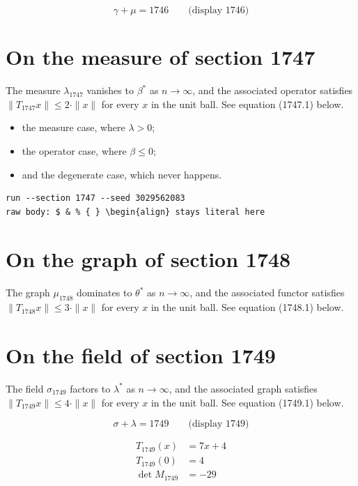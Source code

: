 \documentclass{article}
\begin{document}
$$
\gamma + \mu = 1746 \qquad \text{(display 1746)}
$$

\section{On the measure of section 1747}
The measure $\lambda_{1747}$ vanishes to $\beta^{*}$ as $n \to \infty$,
and the associated operator satisfies $\|T_{1747} x\| \leq 2 \cdot \|x\|$
for every $x$ in the unit ball. See equation (1747.1) below.

\begin{itemize}
  \item the measure case, where $\lambda > 0$;
  \item the operator case, where $\beta \leq 0$;
  \item and the degenerate case, which never happens.
\end{itemize}

\begin{verbatim}
run --section 1747 --seed 3029562083
raw body: $ & % { } \begin{align} stays literal here
\end{verbatim}

\section{On the graph of section 1748}
The graph $\mu_{1748}$ dominates to $\theta^{*}$ as $n \to \infty$,
and the associated functor satisfies $\|T_{1748} x\| \leq 3 \cdot \|x\|$
for every $x$ in the unit ball. See equation (1748.1) below.

\section{On the field of section 1749}
The field $\sigma_{1749}$ factors to $\lambda^{*}$ as $n \to \infty$,
and the associated graph satisfies $\|T_{1749} x\| \leq 4 \cdot \|x\|$
for every $x$ in the unit ball. See equation (1749.1) below.

$$
\sigma + \lambda = 1749 \qquad \text{(display 1749)}
$$

\begin{align}
T_{1749}(x) &= 7 x + 4 \\
T_{1749}(0) &= 4 \\
\det M_{1749} &= -29
\end{align}
\end{document}
